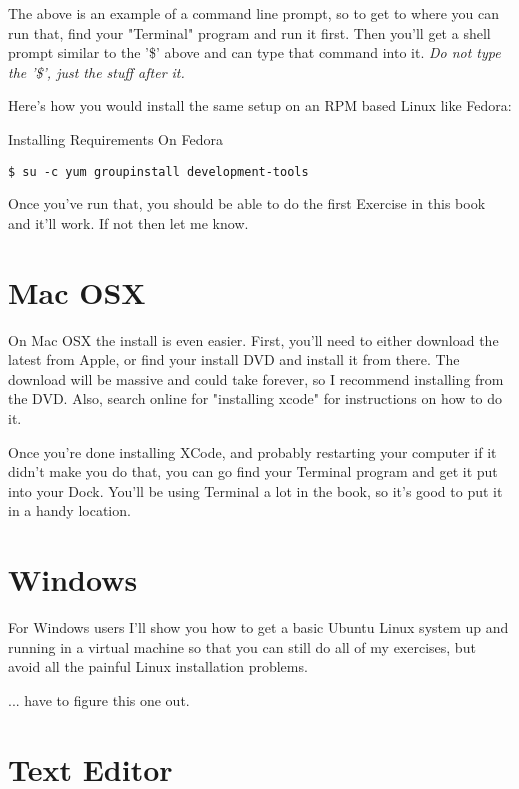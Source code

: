 The above is an example of a command line prompt, so to get to where
you can run that, find your "Terminal" program and run it first.  Then
you'll get a shell prompt similar to the '\$' above and can type that
command into it.  \emph{Do not type the '\$', just the stuff after it.}

Here's how you would install the same setup on an RPM based Linux
like Fedora:

\begin{code}{Installing Requirements On Fedora}
\begin{lstlisting}
$ su -c yum groupinstall development-tools
\end{lstlisting}
\end{code}

Once you've run that, you should be able to do the first Exercise in
this book and it'll work.  If not then let me know.


\section{Mac OSX}

On Mac OSX the install is even easier.  First, you'll need to either 
download the latest  from Apple, or find your install
DVD and install it from there.  The download will be massive and could
take forever, so I recommend installing from the DVD.  Also, search
online for "installing xcode" for instructions on how to do it.

Once you're done installing XCode, and probably restarting your computer
if it didn't make you do that, you can go find your Terminal program
and get it put into your Dock.  You'll be using Terminal a lot in
the book, so it's good to put it in a handy location.


\section{Windows}

For Windows users I'll show you how to get a basic Ubuntu Linux system up and
running in a virtual machine so that you can still do all of my exercises, but
avoid all the painful Linux installation problems.

... have to figure this one out.


\section{Text Editor}

